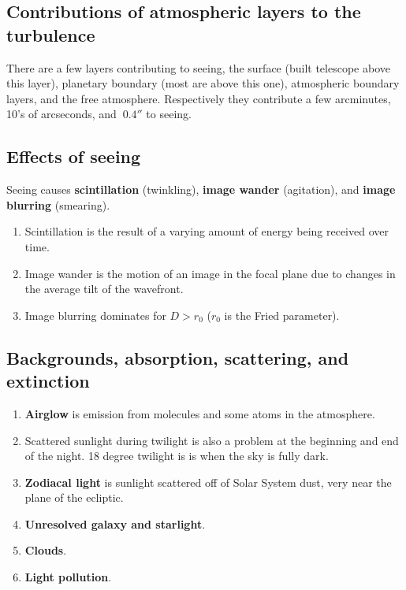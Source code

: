 \documentclass[a4paper]{article}
\begin{document}
\subsection{Contributions of atmospheric layers to the turbulence}

There are a few layers contributing to seeing, the surface (built telescope above this layer), planetary boundary (most are above this one), atmospheric boundary layers, and the free atmosphere. Respectively they contribute a few arcminutes, 10's of arcseconds, and $~0.4\si{\arcsecond}$ to seeing.

\subsection{Effects of seeing}

Seeing causes \textbf{scintillation} (twinkling), \textbf{image wander} (agitation), and \textbf{image blurring} (smearing). 

\begin{enumerate}
    \item Scintillation is the result of a varying amount of energy being received over time.
    \item Image wander is the motion of an image in the focal plane due to changes in the average tilt of the wavefront.
    \item Image blurring dominates for $D>r_0$ ($r_0$ is the Fried parameter).
\end{enumerate}

\subsection{Backgrounds, absorption, scattering, and extinction}

\begin{enumerate}
    \item \textbf{Airglow} is emission from molecules and some atoms in the atmosphere. 
    \item Scattered sunlight during twilight is also a problem at the beginning and end of the night. 18 degree twilight is is when the sky is fully dark.
    \item \textbf{Zodiacal light} is sunlight scattered off of Solar System dust, very near the plane of the ecliptic.
    \item \textbf{Unresolved galaxy and starlight}.
    \item \textbf{Clouds}.
    \item \textbf{Light pollution}.
\end{enumerate}
\end{document}
